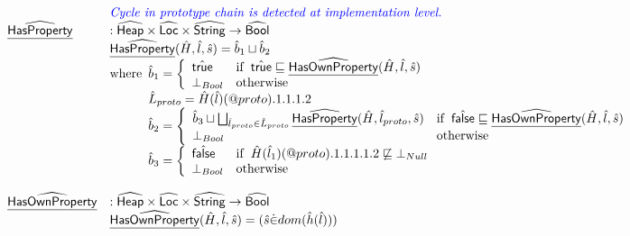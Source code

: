 \[
\begin{array}{ll}

& {\color{blue} \textit{Cycle in prototype chain is detected at implementation level.}} \\
\widehat{\underline{\sf HasProperty}} & : \widehat{\mbox{\textsf{Heap}}} \times \widehat{\mbox{\textsf{Loc}}} \times \widehat{\mbox{\textsf{String}}} \rightarrow \widehat{\mbox{\textsf{Bool}}} \\
& \widehat{\underline{\sf HasProperty}}(\hat{H},\hat{l},\hat{s}) = \hat{b}_1\sqcup\hat{b}_2 \\
& {\rm where}\begin{array}[t]{l}
  \hat{b}_1 = \left\{
    \begin{array}{ll}
      \hat{\mbox{\textsf{true}}} & {\rm if}\begin{array}[t]{l}\hat{\mbox{\textsf{true}}}\sqsubseteq\widehat{\underline{\sf HasOwnProperty}}(\hat{H},\hat{l},\hat{s})\end{array} \\
      \bot_{Bool} & {\rm otherwise} \\
    \end{array}
    \right.\\
    \hat{L}_{proto} = \hat{H}(\hat{l})(@proto).1.1.1.2 \\
  \hat{b}_2 = \left\{
    \begin{array}{ll}
      \hat{b}_3 \sqcup \bigsqcup_{\hat{l}_{proto}\in\hat{L}_{proto}}\widehat{\underline{\sf HasProperty}}(\hat{H},\hat{l}_{proto},\hat{s})
      & {\rm if}\begin{array}[t]{l}\hat{\mbox{\textsf{false}}}\sqsubseteq\widehat{\underline{\sf HasOwnProperty}}(\hat{H},\hat{l},\hat{s})\end{array} \\
      \bot_{Bool} & {\rm otherwise} \\
    \end{array}
    \right.\\
    \hat{b}_3 =
    \left\{
      \begin{array}{ll}
        \hat{\mbox{\textsf{false}}} & {\rm if}\begin{array}[t]{l}\hat{H}(\hat{l}_1)(@proto).1.1.1.1.2 \not\sqsubseteq \bot_{Null}\end{array}\\
        \bot_{Bool} & {\rm otherwise}\\
      \end{array}
    \right.\\
  \end{array}\\
\\

\widehat{\underline{\sf HasOwnProperty}} & : \widehat{\mbox{\textsf{Heap}}} \times \widehat{\mbox{\textsf{Loc}}} \times \widehat{\mbox{\textsf{String}}} \rightarrow \widehat{\mbox{\textsf{Bool}}} \\
&  \widehat{\underline{\sf HasOwnProperty}}(\hat{H},\hat{l},\hat{s}) = (\hat{s} \dot{\in} dom(\hat{h}(\hat{l})))\\
\\\\


\end{array}\]
